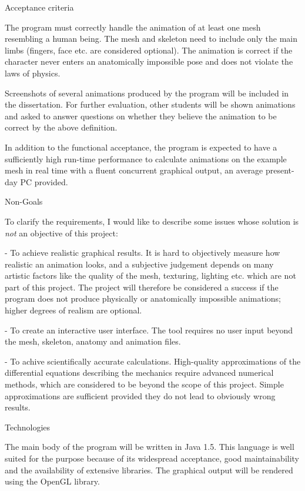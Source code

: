 \documentclass{article}
\begin{document}
Acceptance criteria

The program must correctly handle the animation of at least one mesh
resembling a human being. The mesh and skeleton need to include only
the main limbs (fingers, face etc. are considered optional). The
animation is correct if the character never enters an anatomically
impossible pose and does not violate the laws of physics.

Screenshots of several animations produced by the program will be
included in the dissertation. For further evaluation, other students
will be shown animations and asked to answer questions on whether they
believe the animation to be correct by the above definition.

In addition to the functional acceptance, the program is expected to
have a sufficiently high run-time performance to calculate animations
on the example mesh in real time with a fluent concurrent graphical
output, an average present-day PC provided.


Non-Goals

To clarify the requirements, I would like to describe some issues
whose solution is {\em not} an objective of this project:

- To achieve realistic graphical results. It is hard to objectively
  measure how realistic an animation looks, and a subjective judgement
  depends on many artistic factors like the quality of the mesh,
  texturing, lighting etc. which are not part of this project. The
  project will therefore be considered a success if the program does
  not produce physically or anatomically impossible animations; higher
  degrees of realism are optional.

- To create an interactive user interface. The tool requires no user
  input beyond the mesh, skeleton, anatomy and animation files.

- To achive scientifically accurate calculations. High-quality
  approximations of the differential equations describing the
  mechanics require advanced numerical methods, which are considered
  to be beyond the scope of this project. Simple approximations are
  sufficient provided they do not lead to obviously wrong results.


Technologies

The main body of the program will be written in Java 1.5. This
language is well suited for the purpose because of its widespread
acceptance, good maintainability and the availability of extensive
libraries. The graphical output will be rendered using the OpenGL
library.
\end{document}
